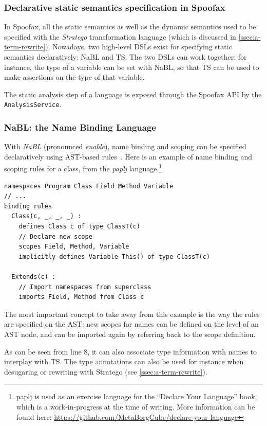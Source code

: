 \subsubsection{Declarative static semantics specification in Spoofax}
\label{ssec:a-orgheadline3}
In Spoofax, all the static semantics as well as the dynamic semantics
used to be specified with the \emph{Stratego} transformation language
(which is discussed in \cref{ssec:a-term-rewrite}). Nowadays, two
high-level DSLs exist for specifying static semantics declaratively:
NaBL and TS. The two DSLs can work together: for instance, the type of
a variable can be set with NaBL, so that TS can be used to make
assertions on the type of that variable.

The static analysis step of a language is exposed through the Spoofax
API by the \texttt{AnalysisService}.

\subsubsection{NaBL: the Name Binding Language}
\label{ssec:a-nabl}
With \emph{NaBL} (pronounced \emph{enable}), name binding and scoping can be
specified declaratively using AST-based
rules~\cite{KonatKWV12}. Here is an example of name binding
and scoping rules for a class, from the \emph{paplj}
language.\footnote{paplj is used as an exercise language for the
``Declare Your Language'' book, which is a work-in-progress at the time
of writing. More information can be found here:
\url{https://github.com/MetaBorgCube/declare-your-language}}
\lstset{language=nabl,numbers=left}
\begin{lstlisting}
namespaces Program Class Field Method Variable
// ...
binding rules
  Class(c, _, _, _) :
    defines Class c of type ClassT(c)
    // Declare new scope
    scopes Field, Method, Variable
    implicitly defines Variable This() of type ClassT(c)

  Extends(c) :
    // Import namespaces from superclass
    imports Field, Method from Class c
\end{lstlisting}
The most important concept to take away from this example is the way
the rules are specified on the AST: new scopes for names can be
defined on the level of an AST node, and can be imported again by
referring back to the scope definition.

As can be seen from line 8, it can also associate type information
with names to interplay with TS. The type annotations can also be used
for instance when desugaring or rewriting with Stratego (see \cref{ssec:a-term-rewrite}).

